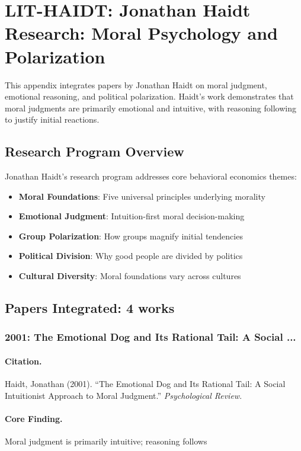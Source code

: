 \section{LIT-HAIDT: Jonathan Haidt Research: Moral Psychology and Polarization}
\label{app:litz}

This appendix integrates papers by Jonathan Haidt on moral judgment,
emotional reasoning, and political polarization. Haidt's work demonstrates that moral
judgments are primarily emotional and intuitive, with reasoning following to justify
initial reactions.

\subsection{Research Program Overview}

Jonathan Haidt's research program addresses core behavioral economics themes:

\begin{itemize}
  \item \textbf{Moral Foundations}: Five universal principles underlying morality
  \item \textbf{Emotional Judgment}: Intuition-first moral decision-making
  \item \textbf{Group Polarization}: How groups magnify initial tendencies
  \item \textbf{Political Division}: Why good people are divided by politics
  \item \textbf{Cultural Diversity}: Moral foundations vary across cultures
\end{itemize}

\subsection{Papers Integrated: 4 works}

\subsubsection{2001: The Emotional Dog and Its Rational Tail: A Social ...}

\paragraph{Citation.}
Haidt, Jonathan (2001). ``The Emotional Dog and Its Rational Tail: A Social Intuitionist Approach to Moral Judgment.''
\textit{Psychological Review}.

\paragraph{Core Finding.}
Moral judgment is primarily intuitive; reasoning follows

